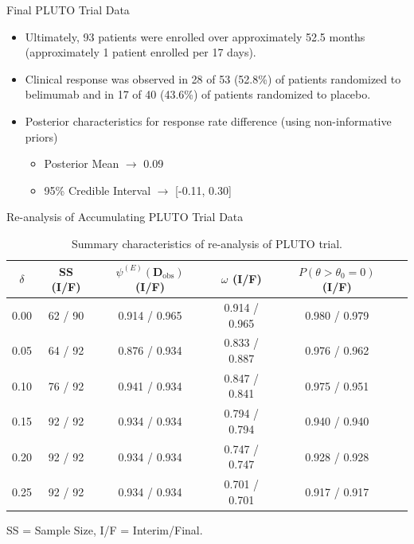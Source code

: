 \documentclass{beamer}
\begin{document}
\begin{frame}{Final PLUTO Trial Data}
\begin{itemize}
\item Ultimately, 93 patients were enrolled over approximately 52.5 months (approximately 1 patient enrolled per 17 days).
%
\vspace{0.5cm}
\item Clinical response was observed in 28 of 53 (52.8\%) of patients randomized to belimumab and in 17 of 40 (43.6\%) of patients randomized to placebo.

\vspace{0.5cm}
\item Posterior characteristics for response rate difference (using non-informative priors)
\begin{itemize}
  \vspace{0.5cm}
	\item Posterior Mean $\rightarrow$ 0.09
	
	\vspace{0.5cm}
	\item 95\% Credible Interval $\rightarrow$ [-0.11, 0.30]
\end{itemize}
\end{itemize}
\end{frame}

\begin{frame}{Re-analysis of Accumulating PLUTO Trial Data}
\footnotesize
\begin{table}[htbp]\label{tbl:real-pluto}%
\centering
\caption{Summary characteristics of re-analysis of PLUTO trial.}%
\begin{tabular*}{300pt}{@{\extracolsep\fill}cccccc@{\extracolsep\fill}}%
\toprule
$\delta$	&	SS (I/F)			&	$\psi^{(E)}(\mathbf{D}_{\text{obs}})$ (I/F)			&	$\omega$ (I/F)			&	$P(\theta>\theta_0=0)$ (I/F)			\\
\midrule
0.00	&	62	/	90	&	0.914	/	0.965	&	0.914	/	0.965	&	0.980	/	0.979	\\
0.05	&	64	/	92	&	0.876	/	0.934	&	0.833	/	0.887	&	0.976	/	0.962	\\
0.10	&	76	/	92	&	0.941	/	0.934	&	0.847	/	0.841	&	0.975	/	0.951	\\
0.15	&	92	/	92	&	0.934	/	0.934	&	0.794	/	0.794	&	0.940	/	0.940	\\
0.20	&	92	/	92	&	0.934	/	0.934	&	0.747	/	0.747	&	0.928	/	0.928	\\
0.25	&	92	/	92	&	0.934	/	0.934	&	0.701	/	0.701	&	0.917	/	0.917	\\
\bottomrule
\end{tabular*}
\end{table}
\hspace{0.75cm} SS = Sample Size, I/F = Interim/Final.
\end{frame}
\end{document}
